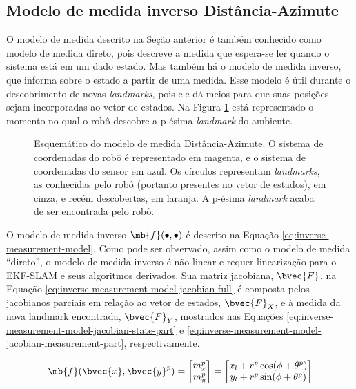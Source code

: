 \subsection{Modelo de medida inverso Distância-Azimute}
\label{sec:inverse-measurement-model}
O modelo de medida descrito na Seção anterior é também conhecido como modelo de medida direto, pois descreve a medida que espera-se ler quando o sistema está em um dado estado. Mas também há o modelo de medida inverso, que informa sobre o estado a partir de uma medida. Esse modelo é útil durante o descobrimento de novas \textit{landmarks}, pois ele dá meios para que suas posições sejam  incorporadas ao vetor de estados. Na Figura \ref{fig:range-bearing-inverse-model-schematic} está representado o momento no qual o robô descobre a p-ésima \textit{landmark} do ambiente.
\begin{figure}[h]
  
  \caption{Esquemático do modelo de medida Distância-Azimute. O sistema de coordenadas do robô é representado em magenta, e o sistema de coordenadas do sensor em azul. Os círculos representam \textit{landmarks}, as conhecidas pelo robô (portanto presentes no vetor de estados), em cinza, e recém descobertas, em laranja. A p-ésima \textit{landmark} acaba de ser encontrada pelo robô.}
  \label{fig:range-bearing-inverse-model-schematic}
\end{figure}

O modelo de medida inverso $\mb{f}(\bullet, \bullet)$ é descrito na Equação \ref{eq:inverse-measurement-model}. Como pode ser observado, assim como o 
modelo de medida ``direto'', o modelo de medida inverso é não linear e requer linearização para o EKF-SLAM e seus 
algoritmos derivados. Sua matriz jacobiana, $\bvec{F}$, na Equação \ref{eq:inverse-measurement-model-jacobian-full} é composta pelos jacobianos 
parciais em relação ao vetor de estados, $\bvec{F}_X$, e à medida da nova 
landmark encontrada, $\bvec{F}_Y$, mostrados nas Equações \ref{eq:inverse-measurement-model-jacobian-state-part} e \ref{eq:inverse-measurement-model-jacobian-measurement-part}, respectivamente.

\begin{equation}
  \mb{f}(\bvec{x}, \bvec{y}^{p}) = 
    \begin{bmatrix}
        m_x^p \\
        m_y^p \\
    \end{bmatrix} =
    \begin{bmatrix}
        x_l + r^p \cos(\phi + \theta^p)\\
        y_l + r^p \sin(\phi + \theta^p) 
    \end{bmatrix}
    \label{eq:inverse-measurement-model}
\end{equation}

